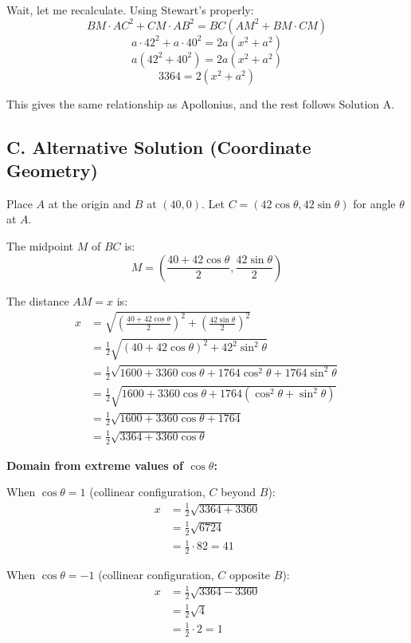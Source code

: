 \documentclass[12pt]{article}
\begin{document}
\begin{solutionbox}
Wait, let me recalculate. Using Stewart's properly:
$$BM \cdot AC^2 + CM \cdot AB^2 = BC(AM^2 + BM \cdot CM)$$
$$a \cdot 42^2 + a \cdot 40^2 = 2a(x^2 + a^2)$$
$$a(42^2 + 40^2) = 2a(x^2 + a^2)$$
$$3364 = 2(x^2 + a^2)$$

This gives the same relationship as Apollonius, and the rest follows Solution A.

\subsection*{C. Alternative Solution (Coordinate Geometry)}

Place $A$ at the origin and $B$ at $(40, 0)$. Let $C = (42\cos\theta, 42\sin\theta)$ for angle $\theta$ at $A$.

The midpoint $M$ of $BC$ is:
$$M = \left(\frac{40 + 42\cos\theta}{2}, \frac{42\sin\theta}{2}\right)$$

The distance $AM = x$ is:
\begin{align*}
    x &= \sqrt{\left(\frac{40 + 42\cos\theta}{2}\right)^2 + \left(\frac{42\sin\theta}{2}\right)^2} \\
    &= \frac{1}{2}\sqrt{(40 + 42\cos\theta)^2 + 42^2\sin^2\theta} \\
    &= \frac{1}{2}\sqrt{1600 + 3360\cos\theta + 1764\cos^2\theta + 1764\sin^2\theta} \\
    &= \frac{1}{2}\sqrt{1600 + 3360\cos\theta + 1764(\cos^2\theta + \sin^2\theta)} \\
    &= \frac{1}{2}\sqrt{1600 + 3360\cos\theta + 1764} \\
    &= \frac{1}{2}\sqrt{3364 + 3360\cos\theta}
\end{align*}

\textbf{Domain from extreme values of $\cos\theta$:}

When $\cos\theta = 1$ (collinear configuration, $C$ beyond $B$):
\begin{align*}
    x &= \frac{1}{2}\sqrt{3364 + 3360} \\
    &= \frac{1}{2}\sqrt{6724} \\
    &= \frac{1}{2} \cdot 82 = 41
\end{align*}

When $\cos\theta = -1$ (collinear configuration, $C$ opposite $B$):
\begin{align*}
    x &= \frac{1}{2}\sqrt{3364 - 3360} \\
    &= \frac{1}{2}\sqrt{4} \\
    &= \frac{1}{2} \cdot 2 = 1
\end{align*}


\end{solutionbox}
\end{document}
